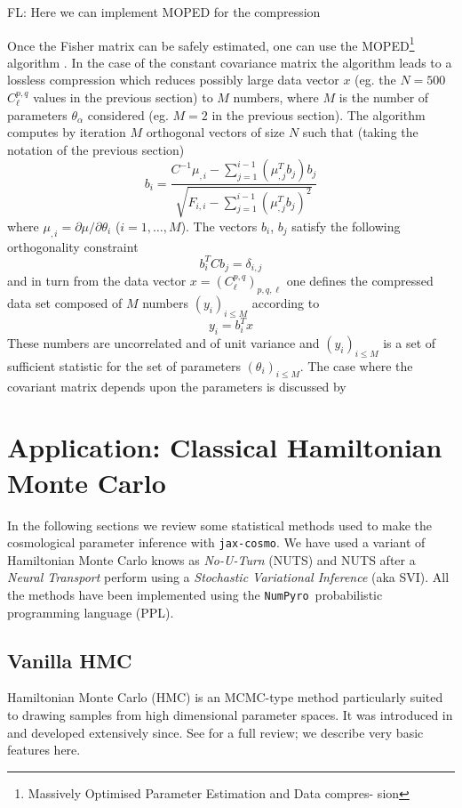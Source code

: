 \documentclass[twocolumn,twocolappendix,nofootinbib,iop]{openjournal}
\newcommand{\FrL}[1]{{\color{cyan}FL: #1}}
\newcommand{\numpyro}{\texttt{NumPyro}}
\newcommand{\jaxcosmo}{\texttt{jax-cosmo}}
\begin{document}
\FrL{Here we can implement MOPED for the compression}

Once the Fisher matrix can be safely estimated, one can use the MOPED\footnote{Massively Optimised Parameter Estimation and Data compres-
sion} algorithm \citep{2000MNRAS.317..965H,2016PhRvD..93h3525Z, 2017MNRAS.472.4244H}. In the case of the constant covariance matrix the algorithm leads to a  lossless compression which reduces possibly large data vector $x$ (eg. the $N=500$ $C_\ell^{p,q}$ values in the previous section) to $M$ numbers, where $M$ is the number of parameters $\theta_\alpha$ considered (eg. $M=2$ in the previous section). The algorithm computes by iteration $M$ orthogonal vectors of size $N$ such that (taking the notation of the previous section)
\begin{equation}
    b_i = \frac{C^{-1}\mu_{,i}-\sum_{j=1}^{i-1}(\mu_{,j}^T b_j)b_j}{\sqrt{F_{i,i}-\sum_{j=1}^{i-1}(\mu_{,j}^T b_j)^2}}
\end{equation}
where $\mu_{,i}=\partial \mu/\partial \theta_i$ ($i=1,\dots,M$). The vectors $b_i$, $b_j$ satisfy the following orthogonality constraint
\begin{equation}
    b_i^T C b_j = \delta_{i,j}
\end{equation}
and in turn from the data vector $x=(C_\ell^{p,q})_{p,q,\ell}$ one defines the compressed data set composed of $M$ numbers $(y_i)_{i\leq M}$ according to
\begin{equation}
    y_i = b_i^T x
\end{equation}
These numbers are uncorrelated and of unit variance and $(y_i)_{i\leq M}$ is a set of sufficient statistic for the set of parameters $(\theta_i)_{i\leq M}$. The case where the covariant matrix depends upon the parameters is discussed by  \citet{2017MNRAS.472.4244H}
%
\section{Application: Classical Hamiltonian Monte Carlo}
\label{sec:chmc}
%
In the following sections we review some statistical methods used to make the cosmological parameter inference with \jaxcosmo. We have used a variant of Hamiltonian Monte Carlo knows as \textit{No-U-Turn} (NUTS) and NUTS after a \textit{Neural Transport} perform using a \textit{Stochastic Variational Inference} (aka SVI). All  the methods have been implemented using the \numpyro\ probabilistic programming language (PPL). 
%
%
%
\subsection{Vanilla HMC}
%
Hamiltonian Monte Carlo (HMC) is an MCMC-type method particularly suited to drawing
samples from high dimensional parameter spaces.  It was introduced in \citep{1987PhLB..195..216D}
and developed extensively since.  See \citet{betancourt} for a full review; we describe
very basic features here.
\end{document}
